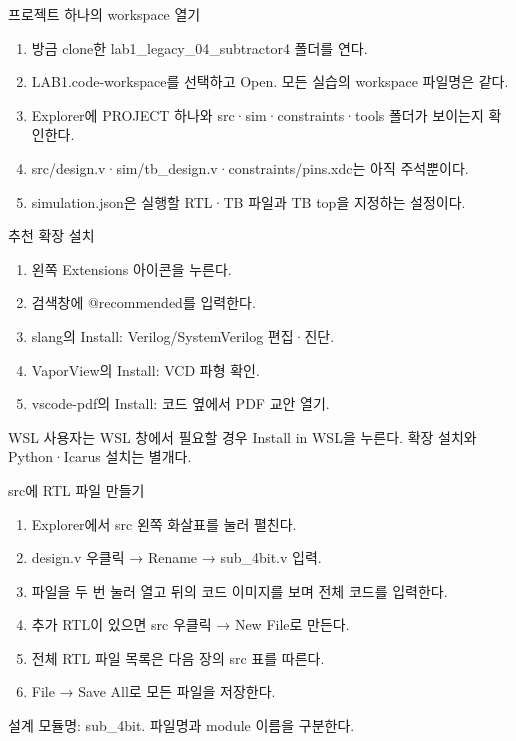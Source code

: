 \begin{frame}{프로젝트 하나의 workspace 열기}\relax
\small
\begin{enumerate}\setlength{\itemsep}{0.22cm}
\item 방금 clone한 lab1\_legacy\_04\_subtractor4 폴더를 연다.
\item LAB1.code-workspace를 선택하고 Open. 모든 실습의 workspace 파일명은 같다.
\item Explorer에 PROJECT 하나와 src·sim·constraints·tools 폴더가 보이는지 확인한다.
\item src/design.v·sim/tb\_design.v·constraints/pins.xdc는 아직 주석뿐이다.
\item simulation.json은 실행할 RTL·TB 파일과 TB top을 지정하는 설정이다.
\end{enumerate}

\end{frame}

\begin{frame}{추천 확장 설치}\relax
\small
\begin{enumerate}\setlength{\itemsep}{0.22cm}
\item 왼쪽 Extensions 아이콘을 누른다.
\item 검색창에 @recommended를 입력한다.
\item slang의 Install: Verilog/SystemVerilog 편집·진단.
\item VaporView의 Install: VCD 파형 확인.
\item vscode-pdf의 Install: 코드 옆에서 PDF 교안 열기.
\end{enumerate}
WSL 사용자는 WSL 창에서 필요할 경우 Install in WSL을 누른다. 확장 설치와 Python·Icarus 설치는 별개다.\par
\end{frame}

\begin{frame}{src에 RTL 파일 만들기}\relax
\small
\begin{enumerate}\setlength{\itemsep}{0.22cm}
\item Explorer에서 src 왼쪽 화살표를 눌러 펼친다.
\item design.v 우클릭 → Rename → sub\_4bit.v 입력.
\item 파일을 두 번 눌러 열고 뒤의 코드 이미지를 보며 전체 코드를 입력한다.
\item 추가 RTL이 있으면 src 우클릭 → New File로 만든다.
\item 전체 RTL 파일 목록은 다음 장의 src 표를 따른다.
\item File → Save All로 모든 파일을 저장한다.
\end{enumerate}
설계 모듈명: sub\_4bit. 파일명과 module 이름을 구분한다.\par
\end{frame}

